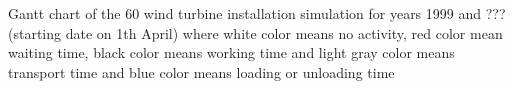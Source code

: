 \label{fig:gantt}
Gantt chart of the 60 wind turbine installation simulation for years 1999 and ??? (starting date on 1th April) where white color means no activity, red color mean waiting time, black color means working time and light gray color means transport time and blue color means loading or unloading time